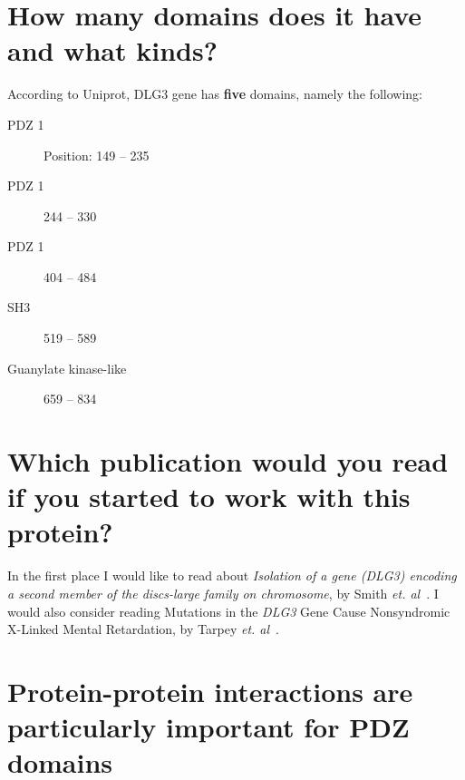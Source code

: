 \clearpage
\section{How many domains does it have and what kinds?}
According to Uniprot, DLG3 gene has \textbf{five} domains, namely the following:
\begin{description}
\item[PDZ 1] Position: 149 – 235
\item[PDZ 1] 244 – 330
\item[PDZ 1] 404 – 484	
\item[SH3] 519 – 589
\item[Guanylate kinase-like] 659 – 834	
\end{description}

\section{Which publication would you read if you started to work with this protein?}

In the first place I would like to read about \emph{Isolation of a gene (DLG3) encoding a second member of the discs-large family on chromosome}, by Smith \emph{et. al}~\cite{smith1996isolation}.
I would also consider reading Mutations in the \emph{DLG3} Gene Cause Nonsyndromic X-Linked Mental Retardation, by Tarpey \emph{et. al}~\cite{tarpey2004mutations}.

\section{Protein-protein interactions are particularly important for PDZ domains}


